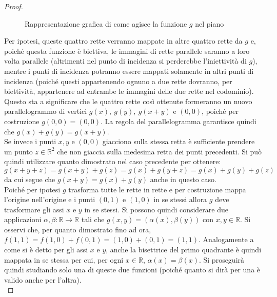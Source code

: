 \begin{proof}
\begin{figure}[h!]
\begin{tikzpicture}[scale=0.8]
	\end{tikzpicture}
	\caption{Rappresentazione grafica di come agisce la funzione $g$ nel piano}
	\label{Fig:PianoLinGen}
	\end{figure}
	Per ipotesi, queste quattro rette verranno mappate in altre quattro rette da $g$ e, poiché questa funzione è biettiva, le immagini di rette parallele saranno a loro volta parallele (altrimenti nel punto di incidenza si perderebbe l'iniettività di $g$), mentre i punti di incidenza potranno essere mappati solamente in altri punti di incidenza (poiché questi appartenendo ognuno a due rette dovranno, per biettività, appartenere ad entrambe le immagini delle due rette nel codominio). Questo sta a significare che le quattro rette così ottenute formeranno un nuovo parallelogrammo di vertici $g(x),\ g(y),\ g(x+y)$ e $(0,0)$, poiché per costruzione $g(0,0)=(0,0)$. La regola del parallelogramma garantisce quindi che $g(x)+g(y)=g(x+y)$.\\
	Se invece i punti $x,y$ e $(0,0)$ giacciono sulla stessa retta è sufficiente prendere un punto $z\in \mathbb{R}^2$ che non giaccia sulla medesima retta dei punti precedenti. Si può quindi utilizzare quanto dimostrato nel caso precedente per ottenere:
	\begin{equation*}
		g(x+y+z)=g(x+y)+g(z)= g(x)+g(y+z)=g(x)+g(y)+g(z)
	\end{equation*}
	da cui segue che $g(x+y)=g(x)+g(y)$ anche in questo caso.\\

    Poiché per ipotesi $g$ trasforma tutte le rette in rette e per costruzione mappa l'origine nell'origine e i punti $(0,1)$ e $(1,0)$ in se stessi allora $g$ deve trasformare gli assi $x$ e $y$ in se stessi. Si possono quindi considerare due applicazioni $\alpha,\beta:\mathbb{R} \rightarrow\mathbb{R} $ tali che $g(x,y)=(\alpha(x),\beta(y))$ con  $x,y\in\mathbb{R}$. Si osservi che, per quanto dimostrato fino ad ora, $f(1,1)=f(1,0)+f(0,1)=(1,0)+(0,1)=(1,1)$. Analogamente a come si è detto per gli assi $x$ e $y$, anche la bisettrice del primo quadrante è quindi mappata in se stessa per cui, per ogni $x\in\mathbb{R}$, $\alpha(x)=\beta(x)$. Si proseguirà quindi studiando solo una di queste due funzioni (poiché quanto si dirà per una è valido anche per l'altra).\\


\end{proof}
